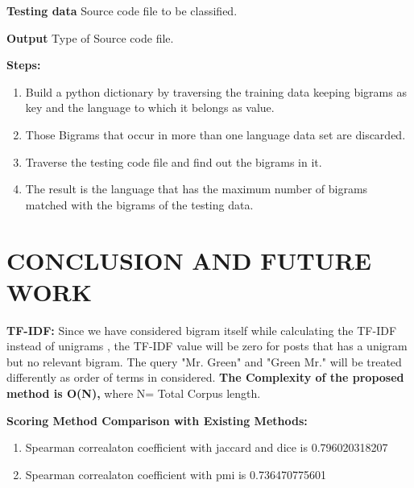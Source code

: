 \documentclass{mnnit}
\begin{document}
\noindent \textbf{Testing data} \newline
Source code file to be classified.

\vspace{2 mm}

\noindent \textbf{Output} \newline
Type of Source code file.

\vspace{2 mm}

\noindent \textbf{Steps:}
	\begin{enumerate}
	\item  Build a python dictionary by traversing the training data keeping bigrams as key and the language to which it belongs as value.
	\item Those Bigrams that occur in more than one language data set are discarded.
	\item Traverse the testing code file and find out the bigrams in it.
	\item The result is the language that has the maximum number of bigrams matched with the bigrams of the testing data.
	\end{enumerate}









\chapter{CONCLUSION AND FUTURE WORK}
\textbf{TF-IDF:}\newline
Since we have considered bigram itself while calculating the TF-IDF instead of unigrams , the TF-IDF value will be zero for posts that has a unigram but no relevant bigram. The query "Mr. Green" and "Green Mr." will be treated differently as order of terms in considered.
\newline
\noindent \textbf{The Complexity of the proposed method is O(N),} \newline where N= Total Corpus length.


\noindent \textbf{Scoring Method Comparison with Existing Methods:}
\begin{enumerate}\bfseries
\item Spearman correalaton coefficient with jaccard and dice is 0.796020318207
\item Spearman correalaton coefficient with pmi is 0.736470775601
\end{enumerate}
\end{document}
